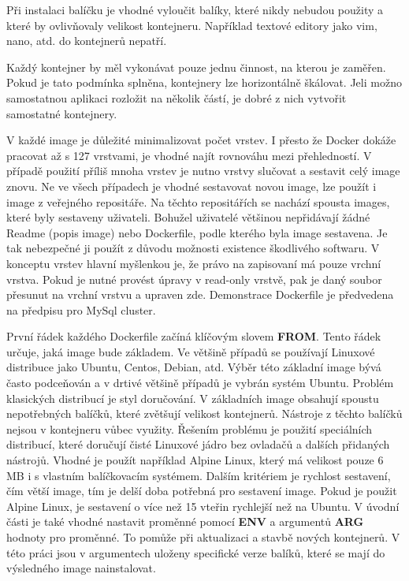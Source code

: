 Při instalaci balíčku je vhodné vyloučit balíky, které nikdy nebudou použity a které by ovlivňovaly velikost kontejneru. Například textové editory jako vim, nano, atd. do kontejnerů nepatří.

Každý kontejner by měl vykonávat pouze jednu činnost, na kterou je zaměřen. Pokud je tato podmínka splněna, kontejnery lze horizontálně škálovat. Jeli možno samostatnou aplikaci rozložit na několik částí, je dobré z nich vytvořit samostatné kontejnery.

V každé image je důležité minimalizovat počet vrstev. I přesto že Docker dokáže pracovat až s 127 vrstvami, je vhodné najít rovnováhu mezi přehledností. V případě použití příliš mnoha vrstev je nutno vrstvy slučovat a sestavit celý image znovu. Ne ve všech případech je vhodné sestavovat novou image, lze použít i image z veřejného repositáře. Na těchto repositářích se nachází spousta images, které byly sestaveny uživateli. Bohužel uživatelé většinou nepřidávají žádné Readme (popis image) nebo Dockerfile, podle kterého byla image sestavena. Je tak nebezpečné ji použít z důvodu možnosti existence škodlivého softwaru. V konceptu vrstev hlavní myšlenkou je, že právo na zapisovaní má pouze vrchní vrstva\cite{Docker_learning}. Pokud je nutné provést úpravy v read-only vrstvě, pak je daný soubor přesunut na vrchní vrstvu a upraven zde. Demonstrace Dockerfile je předvedena na předpisu pro MySql cluster.

První řádek každého Dockerfile začíná klíčovým slovem \textbf{FROM}. Tento řádek určuje, jaká image bude základem. Ve většině případů se používají Linuxové distribuce jako Ubuntu, Centos, Debian, atd. Výběr této základní image bývá často podceňován a v drtivé většině případů je vybrán systém Ubuntu. Problém klasických distribucí je styl doručování. V základních image obsahují spoustu nepotřebných balíčků, které zvětšují velikost kontejnerů. Nástroje z těchto balíčků nejsou v kontejneru vůbec využity. Řešením  problému je použití speciálních distribucí, které doručují čisté Linuxové jádro bez ovladačů a dalších přidaných nástrojů. Vhodné je použít například Alpine Linux, který má velikost pouze 6 MB i s vlastním balíčkovacím systémem. Dalším kritériem je rychlost sestavení, čím větší image, tím je delší doba potřebná pro sestavení image. Pokud je použit Alpine Linux, je sestavení o více než 15 vteřin rychlejší než na Ubuntu\cite{ubuntu_alpine}. V úvodní části je také vhodné nastavit proměnné pomocí \textbf{ENV} a argumentů \textbf{ARG} hodnoty pro proměnné. To pomůže při aktualizaci a stavbě nových kontejnerů. V této práci jsou v argumentech uloženy specifické verze balíků, které se mají do výsledného image nainstalovat.

